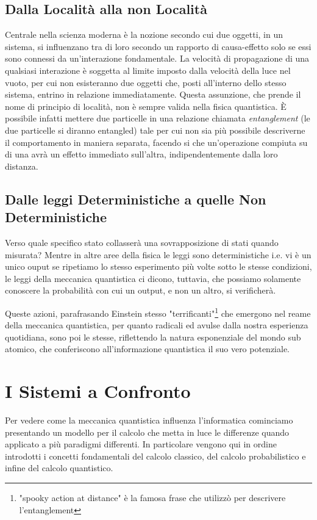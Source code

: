 \documentclass[12pt,a4paper,openright]{report}
\begin{document}
\subsection{Dalla Località alla non Località}
Centrale nella scienza moderna è la nozione secondo cui due oggetti, in un sistema, si influenzano tra di loro secondo un rapporto di causa-effetto solo se essi
sono connessi da un'interazione fondamentale. La velocità di propagazione di una qualsiasi interazione è soggetta al limite imposto dalla velocità della luce 
nel vuoto, per cui non esisteranno due oggetti che, posti all'interno dello stesso sistema, entrino in relazione immediatamente. Questa assunzione, 
che prende il nome di principio di località, non è sempre valida nella fisica quantistica. È possibile infatti
mettere due particelle in una relazione chiamata \emph{entanglement} (le due particelle si diranno entangled) tale per cui non sia più possibile
descriverne il comportamento in maniera separata, facendo si che un'operazione compiuta su di una avrà un effetto immediato sull'altra, 
indipendentemente dalla loro distanza.    

\subsection{Dalle leggi Deterministiche a quelle Non Deterministiche}
Verso quale specifico stato collasserà una sovrapposizione di stati quando misurata? Mentre in altre aree della fisica le leggi sono deterministiche 
i.e. vi è un unico ouput se ripetiamo lo stesso esperimento più volte sotto le stesse condizioni, le leggi della meccanica quantistica
ci dicono, tuttavia, che possiamo solamente conoscere la probabilità con cui un output, e non un altro, si verificherà. \par

Queste azioni, parafrasando Einstein stesso "terrificanti"\footnote{"spooky action at distance" è la famosa frase che utilizzò per descrivere l'entanglement} che emergono nel reame della meccanica quantistica, per quanto radicali ed avulse
dalla nostra esperienza quotidiana, sono poi le stesse, riflettendo la natura esponenziale del mondo sub atomico, che conferiscono all'informazione quantistica il suo vero potenziale. 

\section{I Sistemi a Confronto}
Per vedere come la meccanica quantistica influenza l'informatica cominciamo presentando un modello per il calcolo che metta in luce 
le differenze quando applicato a più paradigmi differenti. In particolare vengono qui in ordine introdotti i concetti fondamentali 
del calcolo classico, del calcolo probabilistico e infine del calcolo quantistico.
\end{document}
